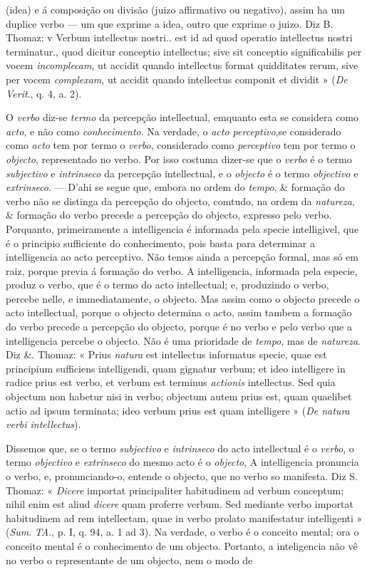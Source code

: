 (idea) e á composição ou divisão (juizo affirmativo ou negativo), assim ha um duplice verbo --- um que exprime a idea, outro que exprime o juizo. Diz B. Thomaz: v Verbum intellectus nostri.. est id ad quod operatio intellectus nostri terminatur., quod dicitur conceptio intellectus; sive sit conceptio significabilis per vocem \emph{incomplecam}, ut accidit quando intellectus format quidditates rerum, sive per vocem \emph{complexam}, ut accidit quando intellectus componit et dividit » (\emph{De Verit}., q. 4, a. 2).\par O \emph{verbo} diz-se \emph{termo} da percepção intellectual, emquanto esta se considera como \emph{acto}, e não como \emph{conhecimento}. Na verdade, o \emph{acto perceptivo},se considerado como \emph{acto} tem por termo o \emph{verbo}, considerado como \emph{perceptivo} tem por termo o \emph{objecto}, representado no verbo. Por isso costuma dizer-se que o \emph{verbo} é o termo \emph{subjectivo} e \emph{intrinseco} da percepção intellectual, e o \emph{objecto} é o termo \emph{objectivo} e \emph{extrinseco}. --- D'ahi se segue que, embora no ordem do \emph{tempo}, \& formação do verbo não se distinga da percepção do objecto, comtudo, na ordem da \emph{natureza}, \& formação do verbo precede a percepção do objecto, expresso pelo verbo. Porquanto, primeiramente a intelligencia é informada pela specie intelligivel, que é o principio sufficiente do conhecimento, pois basta para determinar a intelligencia ao acto perceptivo. Não temos ainda a percepção formal, mas só em raiz, porque previa á formação do verbo. A intelligencia, informada pela especie, produz o verbo, que é o termo do acto intellectual; e, produzindo o verbo, percebe nelle, e immediatamente, o objecto. Mas assim como o objecto precede o acto intellectual, porque o objecto determina o acto, assim tambem a formação do verbo precede a percepção do objecto, porque é no verbo e pelo verbo que a intelligencia percebe o objecto. Não é uma prioridade de \emph{tempo}, mas de \emph{natureza}. Diz \&. Thomaz: « Prius \emph{natura} est intellectus informatus specie, quae est principium sufficiens intelligendi, quam gignatur verbum; et ideo intelligere in radice prius est verbo, et verbum est terminus \emph{actionis} intellectus. Sed quia objectum non habetur nisi in verbo; objectum autem prius est, quam quaelibet actio ad ipsum terminata; ideo verbum prius est quam intelligere » (\emph{De natura verbi intellectus}).\par Dissemos que, se o termo \emph{subjectivo} e \emph{intrinseco} do acto intellectual é o \emph{verbo}, o termo \emph{objectivo} e \emph{extrinseco} do mesmo acto é o \emph{objecto}, A intelligencia pronuncia o verbo, e, pronunciando-o, entende o objecto, que no verbo so manifesta. Diz S. Thomaz: « \emph{Dicere} importat principaliter habitudinem ad verbum conceptum; nihil enim est aliud \emph{dicere} quam proferre verbum. Sed mediante verbo importat habitudinem ad rem intellectam, quae in verbo prolato manifestatur intelligenti » (\emph{Sum}. \emph{TA}., p. I, q. 94, a. 1 ad 3). Na verdade, o verbo é o conceito mental; ora o conceito mental é o conhecimento de um objecto. Portanto, a inteligencia não vê no verbo o representante de um objecto, nem o modo de 
